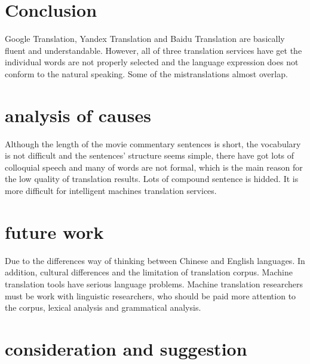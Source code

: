 \documentclass[conference]{IEEEtran}
\begin{document}
\begin{CJK*}{UTF8}{gbsn}
\section{Conclusion}
Google Translation, Yandex Translation and Baidu Translation are basically
fluent and understandable. However, all of three translation services have get the
individual words are not properly selected and the language expression does not
conform to the natural speaking. Some of the mistranslations almost overlap.

\section{analysis of causes}
Although the length of the movie commentary sentences is short, the vocabulary
is not difficult and the sentences' structure seems simple, there have got
lots of colloquial speech and many of words are not formal, which is the main
reason for the low quality of translation results. Lots of compound
sentence is hidded. It is more difficult for intelligent machines translation
services.

\section{future work}
Due to the differences way of thinking between Chinese and English languages. In
addition, cultural differences and the limitation of translation corpus.
Machine translation tools have serious language problems. Machine translation
researchers must be work with linguistic researchers, who should be paid more
attention to the corpus, lexical analysis and grammatical analysis.

\section{consideration and suggestion}




\end{CJK*}
\end{document}

